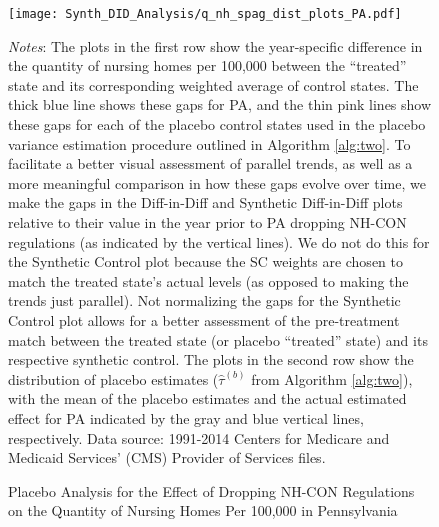 \documentclass[../Main.tex]{subfiles}
\begin{document}
\newpage
\begin{figure}[t]
	\begin{center}
	\caption{\label{fig: q_nh_spag_plots_pa} \centering Placebo Analysis for the Effect of Dropping NH-CON Regulations on the Quantity of Nursing Homes Per 100,000 in Pennsylvania}
    \texttt{[image: Synth\_DID\_Analysis/q\_nh\_spag\_dist\_plots\_PA.pdf]}
    \end{center}
    \footnotesize
		\textit{Notes}: The plots in the first row show the year-specific difference in the quantity of nursing homes per 100,000 between the ``treated'' state and its corresponding weighted average of control states. The thick blue line shows these gaps for PA, and the thin pink lines show these gaps for each of the placebo control states used in the placebo variance estimation procedure outlined in Algorithm \ref{alg:two}. To facilitate a better visual assessment of parallel trends, as well as a more meaningful comparison in how these gaps evolve over time, we make the gaps in the Diff-in-Diff and Synthetic Diff-in-Diff plots relative to their value in the year prior to PA dropping NH-CON regulations (as indicated by the vertical lines). We do not do this for the Synthetic Control plot because the SC weights are chosen to match the treated state's actual levels (as opposed to making the trends just parallel). Not normalizing the gaps for the Synthetic Control plot allows for a better assessment of the pre-treatment match between the treated state (or placebo ``treated'' state) and its respective synthetic control. The plots in the second row show the distribution of placebo estimates ($\hat{\tau}^{(b)}$ from Algorithm \ref{alg:two}), with the mean of the placebo estimates and the actual estimated effect for PA indicated by the gray and blue vertical lines, respectively. Data source: 1991-2014 Centers for Medicare and Medicaid Services’ (CMS) Provider of Services files.
\end{figure}
\clearpage
\end{document}
